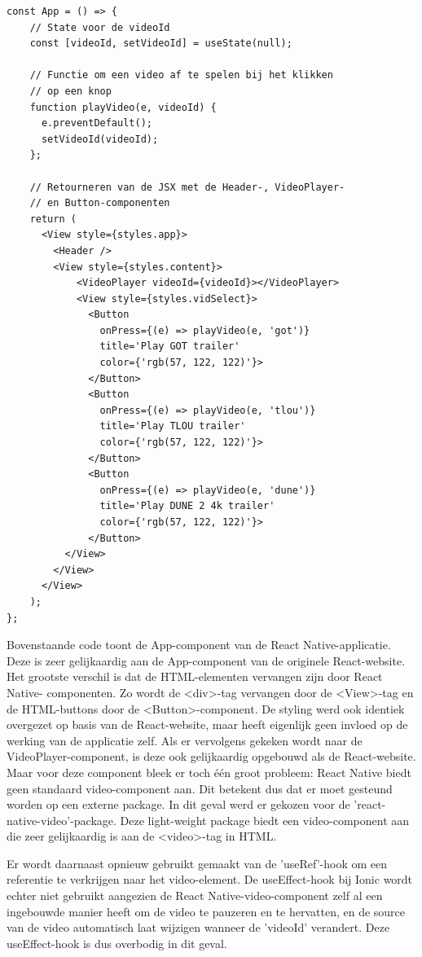 \begin{mdframed}[backgroundcolor=bg]
  \begin{verbatim}
const App = () => {
    // State voor de videoId
    const [videoId, setVideoId] = useState(null);

    // Functie om een video af te spelen bij het klikken
    // op een knop
    function playVideo(e, videoId) {
      e.preventDefault();
      setVideoId(videoId);
    };

    // Retourneren van de JSX met de Header-, VideoPlayer-
    // en Button-componenten
    return (
      <View style={styles.app}>
        <Header />
        <View style={styles.content}>
            <VideoPlayer videoId={videoId}></VideoPlayer>
            <View style={styles.vidSelect}>
              <Button
                onPress={(e) => playVideo(e, 'got')}
                title='Play GOT trailer'
                color={'rgb(57, 122, 122)'}>
              </Button>
              <Button
                onPress={(e) => playVideo(e, 'tlou')}
                title='Play TLOU trailer'
                color={'rgb(57, 122, 122)'}>
              </Button>
              <Button
                onPress={(e) => playVideo(e, 'dune')}
                title='Play DUNE 2 4k trailer'
                color={'rgb(57, 122, 122)'}>
              </Button>
          </View>
        </View>
      </View>
    );
};
  \end{verbatim}
\end{mdframed}

Bovenstaande code toont de App-component van de React Native-applicatie. Deze is zeer gelijkaardig aan de App-component van de originele React-website. Het grootste verschil is dat de HTML-elementen vervangen zijn door React Native- componenten. Zo wordt de <div>-tag vervangen door de <View>-tag en de HTML-buttons door de <Button>-component. De styling werd ook identiek overgezet op basis van de React-website, maar heeft eigenlijk geen invloed op de werking van de applicatie zelf. Als er vervolgens gekeken wordt naar de VideoPlayer-component, is deze ook gelijkaardig opgebouwd als de React-website. Maar voor deze component bleek er toch één groot probleem: React Native biedt geen standaard video-component aan. Dit betekent dus dat er moet gesteund worden op een externe package. In dit geval werd er gekozen voor de 'react-native-video'-package. Deze light-weight package biedt een video-component aan die zeer gelijkaardig is aan de <video>-tag in HTML.

Er wordt daarnaast opnieuw gebruikt gemaakt van de 'useRef'-hook om een referentie te verkrijgen naar het video-element. De useEffect-hook bij Ionic wordt echter niet gebruikt aangezien de React Native-video-component zelf al een ingebouwde manier heeft om de video te pauzeren en te hervatten, en de source van de video automatisch laat wijzigen wanneer de 'videoId' verandert. Deze useEffect-hook is dus overbodig in dit geval.

